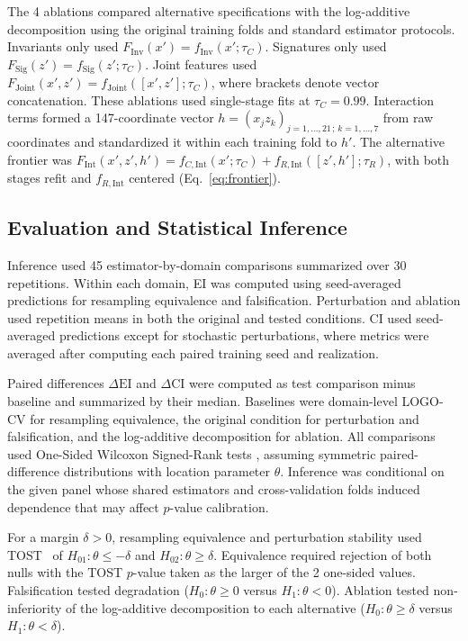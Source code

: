 \documentclass{article}
\begin{document}
The 4 ablations compared alternative specifications with the log-additive decomposition using the original training folds and standard estimator protocols. Invariants only used $F_{\mathrm{Inv}}(x') = f_{\mathrm{Inv}}(x'; \tau_C)$. Signatures only used $F_{\mathrm{Sig}}(z') = f_{\mathrm{Sig}}(z'; \tau_C)$. Joint features used $F_{\mathrm{Joint}}(x', z') = f_{\mathrm{Joint}}([x', z']; \tau_C)$, where brackets denote vector concatenation. These ablations used single-stage fits at $\tau_C = 0.99$. Interaction terms formed a 147-coordinate vector $h = {(x_j z_k)}_{j=1,\ldots,21\,;\,k=1,\ldots,7}$ from raw coordinates and standardized it within each training fold to $h'$. The alternative frontier was $F_{\mathrm{Int}}(x', z', h') = f_{C,\mathrm{Int}}(x'; \tau_C) + f_{R,\mathrm{Int}}([z', h']; \tau_R)$, with both stages refit and $f_{R,\mathrm{Int}}$ centered (Eq.~\eqref{eq:frontier}).

\subsection*{Evaluation and Statistical Inference}
\label{sec:si-stat-conventions}
Inference used 45 estimator-by-domain comparisons summarized over 30 repetitions. Within each domain, EI was computed using seed-averaged predictions for resampling equivalence and falsification. Perturbation and ablation used repetition means in both the original and tested conditions. CI used seed-averaged predictions except for stochastic perturbations, where metrics were averaged after computing each paired training seed and realization.

Paired differences $\Delta\mathrm{EI}$ and $\Delta\mathrm{CI}$ were computed as test comparison minus baseline and summarized by their median. Baselines were domain-level LOGO-CV for resampling equivalence, the original condition for perturbation and falsification, and the log-additive decomposition for ablation. All comparisons used One-Sided Wilcoxon Signed-Rank tests \citep{ref45}, assuming symmetric paired-difference distributions with location parameter $\theta$. Inference was conditional on the given panel whose shared estimators and cross-validation folds induced dependence that may affect $p$-value calibration.

For a margin $\delta > 0$, resampling equivalence and perturbation stability used TOST~\citep{ref47} of $H_{01}: \theta \le -\delta$ and $H_{02}: \theta \ge \delta$. Equivalence required rejection of both nulls with the TOST $p$-value taken as the larger of the 2 one-sided values. Falsification tested degradation ($H_0: \theta \ge 0$ versus $H_1: \theta < 0$). Ablation tested non-inferiority of the log-additive decomposition to each alternative \citep{ref78} ($H_0: \theta \ge \delta$ versus $H_1: \theta < \delta$).
\end{document}
